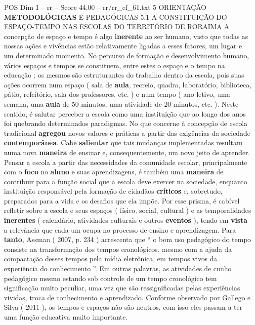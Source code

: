 \begin{textsample}{POS Dim 1 – rr – Score 44.00 – rr/rr\_ef\_61.txt}  \label{ex:f1_pos_217}
5 ORIENTAÇÃO \textbf{METODOLÓGICAS} E PEDAGÓGICAS 5.1 A CONSTITUIÇÃO DO ESPAÇO-TEMPO NAS ESCOLAS DO TERRITÓRIO DE RORAIMA A concepção de espaço e tempo é algo \textbf{inerente} ao ser humano, visto que todas as nossas ações e vivências estão relativamente ligadas a esses fatores, um lugar e um determinado momento.
No percurso de formação e desenvolvimento humano, vários espaços e tempos se constituem, entre estes o espaço e o tempo na educação ; os mesmos são estruturantes do trabalho dentro da escola, pois suas ações ocorrem num espaço ( sala de \textbf{aula}, recreio, quadra, laboratório, biblioteca, pátio, refeitório, sala dos professores, etc. ) e num tempo ( ano letivo, uma semana, uma \textbf{aula} de 50 minutos, uma atividade de 20 minutos, etc. ).
Neste sentido, é salutar perceber a escola como uma instituição que ao longo dos anos foi quebrando determinados paradigmas.
No que concerne à concepção de escola tradicional \textbf{agregou} novos valores e práticas a partir das exigências da sociedade \textbf{contemporânea}.
Cabe \textbf{salientar} que tais mudanças implementadas resultam numa nova \textbf{maneira} de ensinar e, consequentemente, um novo jeito de aprender.
Pensar a escola a partir das necessidades da comunidade escolar, principalmente com o \textbf{foco} no \textbf{aluno} e suas aprendizagens, é também uma \textbf{maneira} de contribuir para a função social que a escola deve exercer na sociedade, enquanto instituição responsável pela formação de cidadãos \textbf{críticos} e, sobretudo, preparados para a vida e os desafios que ela impõe.
Por esse prisma, é cabível refletir sobre a escola e seus espaços ( físico, social, cultural ) e as temporalidades \textbf{inerentes} ( calendário, atividades culturais e outros \textbf{eventos} ), tendo em \textbf{vista} a relevância que cada um ocupa no processo de ensino e aprendizagem.
Para \textbf{tanto}, Assman ( 2007, p. 234 ) acrescenta que “ o bom uso pedagógico do tempo consiste na transformação dos tempos cronológicos, mesmo com a ajuda da compactação desses tempos pela mídia eletrônica, em tempos vivos da experiência do conhecimento ”.
Em outras palavras, as atividades de cunho pedagógico mesmo estando sob controle de um tempo cronológico tem significação muito peculiar, uma vez que são ressignificadas pelas experiências vividas, troca de conhecimento e aprendizado.
Conforme observado por Gallego e Silva ( 2011 ), os tempos e espaços não são neutros, com isso eles passam a ter uma função educativa muito importante.

\end{textsample}
